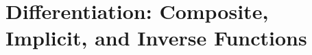 \documentclass[../abcalc.tex]{subfiles}
\begin{document}
\chapter{Differentiation: Composite, Implicit, and Inverse Functions}
\end{document}
